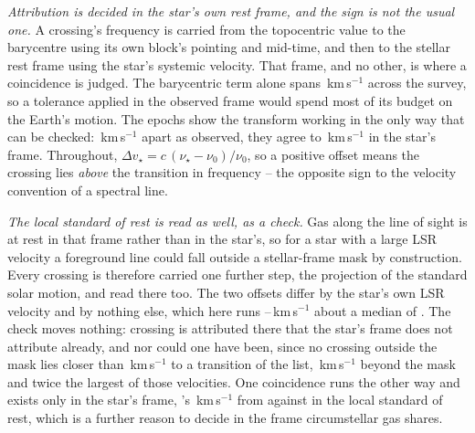 \emph{Attribution is decided in the star's own rest frame, and the sign is
not the usual one.} A crossing's frequency is carried from the topocentric
value to the barycentre using its own block's pointing and mid-time, and then
to the stellar rest frame using the star's systemic velocity. That frame, and
no other, is where a coincidence is judged.
The barycentric term alone spans \FrBarySwing\,km\,s$^{-1}$ across the
survey, so a tolerance applied in the observed frame would spend most of its
budget on the Earth's motion. The \FrEpochNEpoch{} \FrEpochStar{} epochs show
the transform working in the only way that can be checked:
\FrEpochTopoKms\,km\,s$^{-1}$ apart as observed, they agree to
\FrEpochStelKms\,km\,s$^{-1}$ in the star's frame.
Throughout, $\Delta v_\star = c\,(\nu_\star-\nu_0)/\nu_0$, so a positive
offset means the crossing lies \emph{above} the transition in frequency --
the opposite sign to the velocity convention of a spectral line.

\emph{The local standard of rest is read as well, as a check.} Gas along the
line of sight is at rest in that frame rather than in the star's, so for a
star with a large LSR velocity a foreground line could fall outside a
stellar-frame mask by construction. Every crossing is therefore carried one
further step, the projection of the standard solar motion, and read there
too. The two offsets differ by the star's own LSR velocity and by nothing
else, which here runs \LsVLsrLo--\LsVLsrHi\,km\,s$^{-1}$ about a median of
\LsVLsrMed. The check moves nothing: \LsNMoveWord{} crossing is attributed
there that the star's frame does not attribute already, and nor
could one have been, since no crossing outside the mask lies closer than
\LsNearestUnattr\,km\,s$^{-1}$ to a transition of the list, \LsGapKms\,km\,s$^{-1}$ beyond the
mask and twice the largest of those velocities. One coincidence runs the
other way and exists only in the star's frame, \LsLeaveStar's
\LsLeaveDvStar\,km\,s$^{-1}$ from \LsLeaveLine{} against \LsLeaveDvLsr{} in
the local standard of rest, which is a further reason to decide in the frame
circumstellar gas shares.

